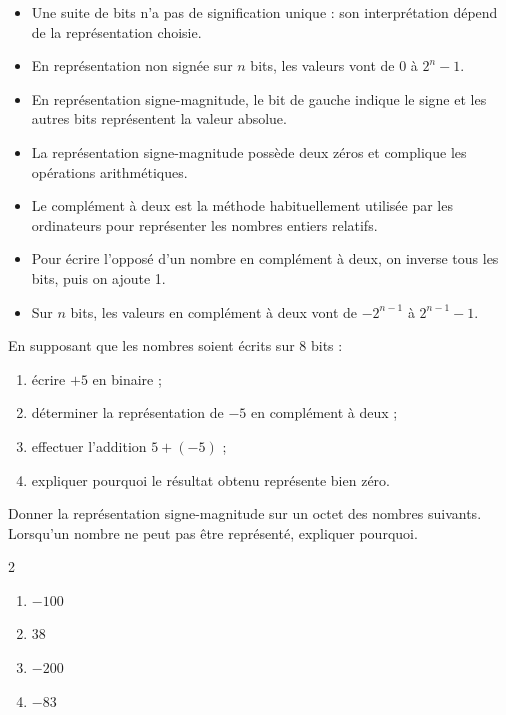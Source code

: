 \documentclass[11pt, a4paper]{book}
\begin{document}
\begin{aretenir}
\begin{itemize}
\renewcommand{\labelitemi}{$\bullet$}

    \item Une suite de bits n'a pas de signification unique : son
    interprétation dépend de la représentation choisie.

    \item En représentation non signée sur $n$ bits, les valeurs vont de
    $0$ à $2^n-1$.

    \item En représentation signe-magnitude, le bit de gauche indique le
    signe et les autres bits représentent la valeur absolue.

    \item La représentation signe-magnitude possède deux zéros et complique
    les opérations arithmétiques.

    \item Le complément à deux est la méthode habituellement utilisée par les
    ordinateurs pour représenter les nombres entiers relatifs.

    \item Pour écrire l'opposé d'un nombre en complément à deux, on inverse
    tous les bits, puis on ajoute 1.

    \item Sur $n$ bits, les valeurs en complément à deux vont de
    $-2^{n-1}$ à $2^{n-1}-1$.
\end{itemize}
\end{aretenir}

\begin{exercice}
En supposant que les nombres soient écrits sur 8 bits :

\begin{enumerate}
    \item écrire $+5$ en binaire ;
    \item déterminer la représentation de $-5$ en complément à deux ;
    \item effectuer l'addition $5+(-5)$ ;
    \item expliquer pourquoi le résultat obtenu représente bien zéro.
\end{enumerate}
\end{exercice}

\begin{exercice}
Donner la représentation signe-magnitude sur un octet des nombres suivants.
Lorsqu'un nombre ne peut pas être représenté, expliquer pourquoi.

\begin{multicols}{2}
\begin{enumerate}
    \item $-100$
    \item $38$
    \item $-200$
    \item $-83$
\end{enumerate}
\end{multicols}
\end{exercice}
\end{document}
